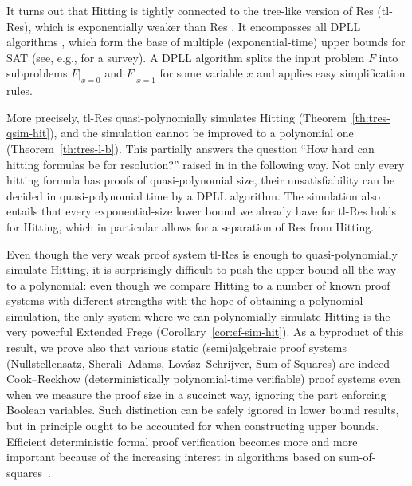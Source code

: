 \documentclass[11pt]{article}
\newcommand{\scterm}[1]{{\textrm{\sc #1}}}
\newcommand{\hit}{\scterm{Hitting}}
\newcommand{\tres}{\scterm{tl-Res}}
\newcommand{\res}{\scterm{Res}}
\newcommand{\F}{\scterm{Frege}}
\newcommand{\EF}{\scterm{Extended {\F}}}
\newcommand{\TODOJ}[1]{}%
\numberwithin{equation}{section}
\begin{document}
It turns out that {\hit} is tightly connected to the tree-like version of {\res} ({\tres)}, which is exponentially weaker than {\res} \cite{BIW04}. It encompasses all DPLL algorithms \cite{DP60,DLL62},
which form the base of multiple (exponential-time) upper bounds for SAT (see, e.g., \cite{DH21} for a survey). A DPLL algorithm splits the input problem $F$ into subproblems $F|_{x=0}$ and $F|_{x=1}$
for some variable $x$ and applies easy simplification rules.


More precisely, {\tres} quasi-polynomially simulates {\hit} (Theorem~\ref{th:tres-qsim-hit}), and the simulation cannot be improved to a polynomial one (Theorem~\ref{th:tres-l-b}). This partially answers the question ``How hard can hitting formulas be for resolution?'' raised in \cite{PS22} in the following way. Not only every hitting formula has proofs of quasi-polynomial size, their unsatisfiability can be decided in quasi-polynomial time by a DPLL algorithm.
 The simulation also entails that every exponential-size lower bound we already have for {\tres} holds for {\hit}, which in particular allows for a separation of {\res} from {\hit}.


Even though the very weak proof system {\tres} is enough to quasi-polynomially simulate {\hit}, it is surprisingly difficult to push the upper bound all the way to a polynomial: even though we compare {\hit} to a number of known proof systems with different strengths with the hope of obtaining a polynomial simulation, the only system where we can polynomially simulate {\hit}
is the very powerful {\EF} (Corollary~\ref{cor:ef-sim-hit}).
As a byproduct of this result, we prove also that
various static (semi)algebraic proof systems (Nullstellensatz, Sherali--Adams, Lov{\'{a}}sz--Schrijver, Sum-of-Squares)
are indeed Cook--Reckhow (deterministically polynomial-time verifiable) proof systems even when we measure the proof size in a succinct way, ignoring the part enforcing Boolean variables. Such distinction can be safely ignored in lower bound results, but in principle ought to be accounted for when constructing upper bounds.
Efficient deterministic formal proof verification becomes more and more important because
of the increasing interest in algorithms based on sum-of-squares~\cite{BS14,FKP19}.%
\end{document}
